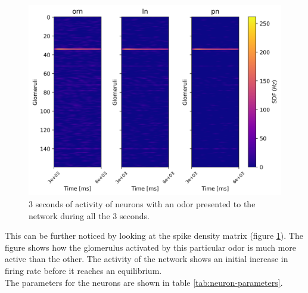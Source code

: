   \begin{figure}
    \centering
    \includegraphics[width=\textwidth]{neuron-odor-sdf}
    \caption{$3$ seconds of activity of neurons with an odor presented to the network during all the $3$ seconds.}
    \label{fig:neuron-odor-sdf}
  \end{figure}

  This can be further noticed by looking at the spike density matrix (figure \ref{fig:neuron-odor-sdf}).
  The figure shows how the glomerulus activated by this particular odor is much more active than the other.
  The activity of the network shows an initial increase in firing rate before it reaches an equilibrium.\\
  The parameters for the neurons are shown in table \ref{tab:neuron-parameters}.

